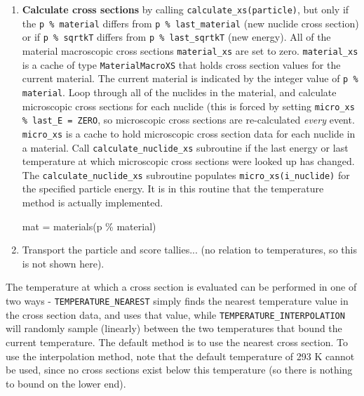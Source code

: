 \documentclass[10pt]{article}
\numberwithin{equation}{section} %
\begin{document}
\begin{enumerate}
\begin{enumerate}
\begin{enumerate}
		\item {\bf Calculate cross sections} by calling {\tt calculate\_xs(particle)}, but only if the {\tt p \% material} differs from {\tt p \% last\_material} (new nuclide cross section) or if {\tt p \% sqrtkT} differs from {\tt p \% last\_sqrtkT} (new energy). All of the material macroscopic cross sections {\tt material\_xs} are set to zero. {\tt material\_xs} is a cache of type {\tt MaterialMacroXS} that holds cross section values for the current material. The current material is indicated by the integer value of {\tt p \% material}. Loop through all of the nuclides in the material, and calculate microscopic cross sections for each nuclide (this is forced by setting {\tt micro\_xs \% last\_E = ZERO}, so microscopic cross sections are re-calculated {\it every} event. {\tt micro\_xs} is a cache to hold microscopic cross section data for each nuclide in a material. Call {\tt calculate\_nuclide\_xs} subroutine if the last energy or last temperature at which microscopic cross sections were looked up has changed. The {\tt calculate\_nuclide\_xs} subroutine populates {\tt micro\_xs(i\_nuclide)} for the specified particle energy. It is in this routine that the temperature method is actually implemented. 
		
				\begin{algorithm}[H]
				\;
				mat = materials(p \% material)\;
				\;
				\end{algorithm}
		
		\item Transport the particle and score tallies... (no relation to temperatures, so this is not shown here). 
		\end{enumerate}
	\end{enumerate}
\end{enumerate}

The temperature at which a cross section is evaluated can be performed in one of two ways - {\tt TEMPERATURE\_NEAREST} simply finds the nearest temperature value in the cross section data, and uses that value, while {\tt TEMPERATURE\_INTERPOLATION} will randomly sample (linearly) between the two temperatures that bound the current temperature. The default method is to use the nearest cross section. To use the interpolation method, note that the default temperature of 293 K cannot be used, since no cross sections exist below this temperature (so there is nothing to bound on the lower end).
\end{document}
